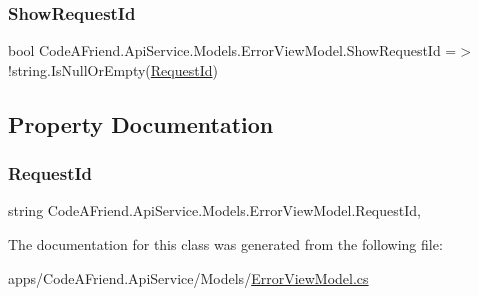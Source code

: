 \subsubsection{\texorpdfstring{Show\+Request\+Id}{ShowRequestId}}
{\footnotesize\ttfamily bool Code\+A\+Friend.\+Api\+Service.\+Models.\+Error\+View\+Model.\+Show\+Request\+Id =$>$ !string.\+Is\+Null\+Or\+Empty(\mbox{\hyperlink{class_code_a_friend_1_1_api_service_1_1_models_1_1_error_view_model_aa19824bbfb14fe33283a6c282b653388}{Request\+Id}})}



\subsection{Property Documentation}
\mbox{\label{class_code_a_friend_1_1_api_service_1_1_models_1_1_error_view_model_aa19824bbfb14fe33283a6c282b653388}} 
\subsubsection{\texorpdfstring{Request\+Id}{RequestId}}
{\footnotesize\ttfamily string Code\+A\+Friend.\+Api\+Service.\+Models.\+Error\+View\+Model.\+Request\+Id\hspace{0.3cm}{\ttfamily [get]}, {\ttfamily [set]}}



The documentation for this class was generated from the following file\+:\begin{DoxyCompactItemize}
\item 
apps/\+Code\+A\+Friend.\+Api\+Service/\+Models/\mbox{\hyperlink{_error_view_model_8cs}{Error\+View\+Model.\+cs}}\end{DoxyCompactItemize}
